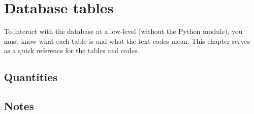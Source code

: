 %
\chapter{Database tables}

To interact with the database at a low-level (without the Python module), you
must know what each table is and what the text codes mean.  This chapter serves
as a quick reference for the tables and codes.


\section{Quantities}




\section{Notes}



